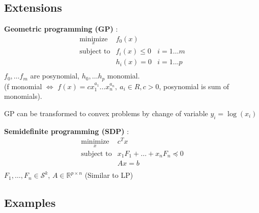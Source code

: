 \documentclass[a4paper, 10pt]{article}
\newcommand{\R}{\mathbb{R}}
\newcommand{\itm}[1]{{\color{itmcolor} \textbf{#1}}}
\begin{document}
\subsection{Extensions}

\begin{multicols}{2}
  \itm{Geometric programming (GP)} :
  \begin{equation*}
    \begin{array}{lll}
      \underset{x}{\text{minimize}} & f_0(x) &\\
      \text{subject to} & f_i(x) \le 0 & i = 1 \dots m\\
                        & h_i(x) = 0 & i = 1 \dots p\\
    \end{array}
  \end{equation*}
  $f_0, \dots f_m$ are posynomial, $h_0, \dots h_p$ monomial.\\(f
  monomial $\iff$
  $f(x) = c x_1^{a_1} \dots x_n^{a_n},\ a_i \in R, c > 0$,
  posynomial is sum of monomials).

  GP can be transformed to convex problems by change of variable
  $y_i = \log(x_i)$

  \itm{Semidefinite programming (SDP)} :
  \begin{equation*}
    \begin{array}{ll}
      \underset{x}{\text{minimize}} & c^T x \\
      \text{subject to} & x_1 F_1 + \dots + x_n F_n \preceq 0\\
                        & A x = b\\
    \end{array}
  \end{equation*}
  $F_1, \dots, F_n \in \mathcal{S}^k$, $A \in \R^{p \times n}$
  (Similar to LP)


\end{multicols}

\subsection{Examples}
\end{document}

